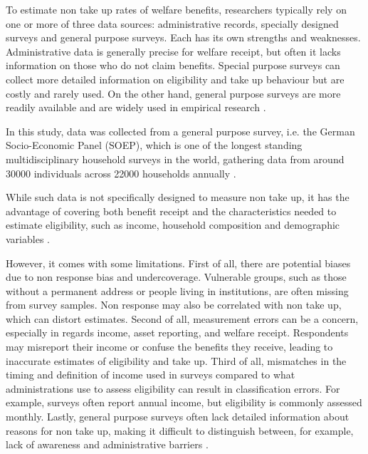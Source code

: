 

To estimate non take up rates of welfare benefits, researchers typically rely on one or more of three data sources: administrative records, specially designed surveys and general purpose surveys. Each has its own strengths and weaknesses. Administrative data is generally precise for welfare receipt, but often it lacks information on those who do not claim benefits. Special purpose surveys can collect more detailed information on eligibility and take up behaviour but are costly and rarely used. On the other hand, general purpose surveys are more readily available and are widely used in empirical research \citep{mechelen_who_2017}.

In this study, data was collected from a general purpose survey, i.e. the German Socio-Economic Panel (SOEP), which is one of the longest standing multidisciplinary household surveys in the world, gathering data from around 30000 individuals across 22000 households annually \citep{berlin_diw_nodate}.

While such data is not specifically designed to measure non take up, it has the advantage of covering both benefit receipt and the characteristics needed to estimate eligibility, such as income, household composition and demographic variables \citep{mechelen_who_2017}.

However, it comes with some limitations. First of all, there are potential biases due to non response bias and undercoverage. Vulnerable groups, such as those without a permanent address or people living in institutions, are often missing from survey samples. Non response may also be correlated with non take up, which can distort estimates. Second of all, measurement errors can be a concern, especially in regards income, asset reporting, and welfare receipt. Respondents may misreport their income or confuse the benefits they receive, leading to inaccurate estimates of eligibility and take up. Third of all, mismatches in the timing and definition of income used in surveys compared to what administrations use to assess eligibility can result in classification errors. For example, surveys often report annual income, but eligibility is commonly assessed monthly. Lastly, general purpose surveys often lack detailed information about reasons for non take up, making it difficult to distinguish between, for example, lack of awareness and administrative barriers \citep{mechelen_who_2017}.

